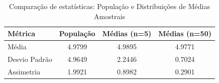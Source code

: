 \begin{table}[H]
\centering
\begin{tabular}{|l|c|c|c|}
\hline
\textbf{Métrica} & \textbf{População} & \textbf{Médias (n=5)} & \textbf{Médias (n=50)} \\
\hline
Média & 4.9799 & 4.9895 & 4.9771 \\
\hline
Desvio Padrão & 4.9649 & 2.2446 & 0.7024 \\
\hline
Assimetria & 1.9921 & 0.8982 & 0.2901 \\
\hline

\end{tabular}
\caption{Comparação de estatísticas: População e Distribuições de Médias Amostrais}
\label{tab:assimetria}
\end{table}